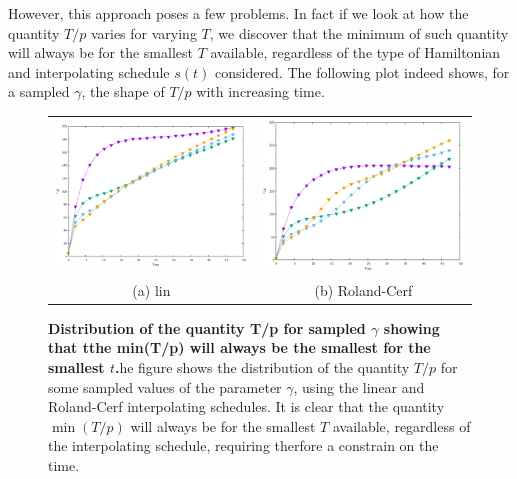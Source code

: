         \noindent
        However, this approach poses a few problems. In fact if we look at how the quantity $T/p$ varies for varying $T$, we discover that the minimum of such quantity will always be for the smallest $T$ available, regardless of the type of Hamiltonian and interpolating schedule $s(t)$ considered. The following plot indeed shows, for a sampled $\gamma$, the shape of $T/p$ with increasing time. \\
        \begin{figure}[ht]
        \centering
        \begin{tabular}{cc}
          \includegraphics[width=75mm]{./figures/sampled_t_over_p/T_p_lin.pdf} &   \includegraphics[width=75mm]{./figures/sampled_t_over_p/T_p_cerf.pdf} \\
        (a) lin & (b) Roland-Cerf\\[6pt]
        \end{tabular}
        \caption[$T/p$ distribution for sampled $\gamma$ showing that the minimum will always be for the smallest $t$ ]{\textbf{Distribution of the quantity T/p for sampled $\gamma$ showing that tthe min(T/p) will always be the smallest for the smallest $t$.}he figure shows the distribution of the quantity $T/p$ for some sampled values of the parameter $\gamma$, using the linear and Roland-Cerf interpolating schedules. It is clear that the quantity $\min(T/p)$ will always be for the smallest $T$ available, regardless of the interpolating schedule, requiring therfore a constrain on the time.}
        \end{figure}

